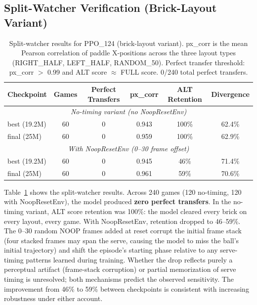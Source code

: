 \documentclass[11pt]{article}
\begin{document}
\subsection{Split-Watcher Verification (Brick-Layout Variant)}
\label{sec:split}

\begin{table}[ht]
\centering
\begin{tabular}{lccccc}
\toprule
\textbf{Checkpoint} & \textbf{Games} & \textbf{Perfect Transfers} &
\textbf{px\_corr} & \textbf{ALT Retention} & \textbf{Divergence} \\
\midrule
\multicolumn{6}{c}{\textit{No-timing variant (no NoopResetEnv)}} \\
\midrule
best (19.2M) & 60 & 0 & 0.943 & 100\% & 62.4\% \\
final (25M)  & 60 & 0 & 0.959 & 100\% & 62.9\% \\
\midrule
\multicolumn{6}{c}{\textit{With NoopResetEnv (0--30 frame offset)}} \\
\midrule
best (19.2M) & 60 & 0 & 0.945 & 46\% & 71.4\% \\
final (25M)  & 60 & 0 & 0.961 & 59\% & 70.6\% \\
\bottomrule
\end{tabular}
\caption{Split-watcher results for PPO\_124 (brick-layout variant). px\_corr is
the mean Pearson correlation of paddle X-positions across the three layout types
(RIGHT\_HALF, LEFT\_HALF, RANDOM\_50). Perfect transfer threshold:
px\_corr $>$ 0.99 and ALT score $\approx$ FULL score. 0/240 total perfect
transfers.}
\label{tab:split}
\end{table}

Table~\ref{tab:split} shows the split-watcher results. Across 240 games (120
no-timing, 120 with NoopResetEnv), the model produced \textbf{zero perfect
transfers}. In the no-timing variant, ALT score retention was 100\%: the model
cleared every brick on every layout, every game. With NoopResetEnv, retention
dropped to 46--59\%. The 0--30 random NOOP frames added at reset corrupt the
initial frame stack (four stacked frames may span the serve, causing the model
to miss the ball's initial trajectory) and shift the episode's starting phase
relative to any serve-timing patterns learned during training. Whether the drop
reflects purely a perceptual artifact (frame-stack corruption) or partial
memorization of serve timing is unresolved; both mechanisms predict the observed
sensitivity. The improvement from 46\% to 59\% between checkpoints is
consistent with increasing robustness under either account.
\end{document}
